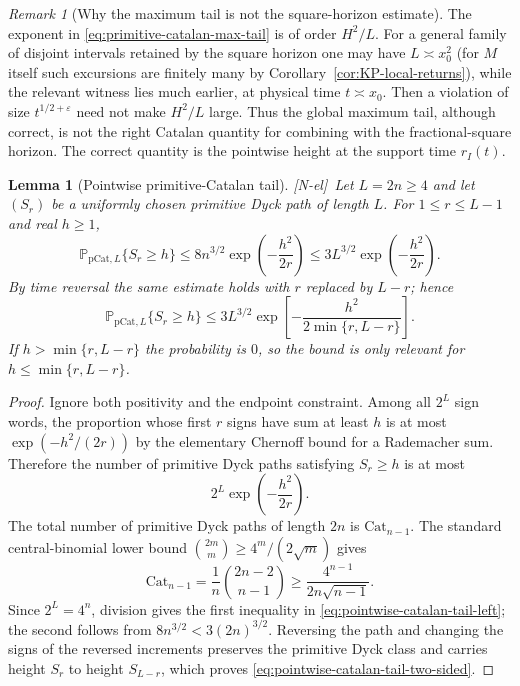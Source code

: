 \documentclass[11pt,reqno]{amsart}
\numberwithin{equation}{section}
\theoremstyle{plain}
\newtheorem{lemma}[theorem]{Lemma}
\theoremstyle{definition}
\theoremstyle{remark}
\newtheorem{remark}[theorem]{Remark}
\newcommand{\eps}{\varepsilon}
\newcommand{\tagNE}{\textup{[N-el]}}
\begin{document}
\begin{remark}[Why the maximum tail is not the square-horizon estimate]
\label{rem:max-tail-square-limit}
The exponent in \eqref{eq:primitive-catalan-max-tail} is of order
$H^2/L$.  For a general family of disjoint intervals retained by the
square horizon one may have $L\asymp x_0^2$ (for $M$ itself such excursions
are finitely many by Corollary~\ref{cor:KP-local-returns}), while the relevant witness lies much earlier, at physical
time $t\asymp x_0$.  Then a violation of size $t^{1/2+\eps}$ need not make
$H^2/L$ large.  Thus the global maximum tail, although correct, is not the
right Catalan quantity for combining with the fractional-square horizon.
The correct quantity is the pointwise height at the support time
$r_I(t)$.
\end{remark}

\begin{lemma}[Pointwise primitive-Catalan tail]
\label{lem:pointwise-catalan-tail}
\tagNE\ Let $L=2n\ge4$ and let $(S_r)$ be a uniformly chosen primitive Dyck path of
length $L$.  For $1\le r\le L-1$ and real $h\ge1$,
\begin{equation}
\label{eq:pointwise-catalan-tail-left}
 \mathbb P_{\mathrm{pCat},L}\{S_r\ge h\}
 \le 8n^{3/2}\exp\!\left(-\frac{h^2}{2r}\right)
 \le 3L^{3/2}\exp\!\left(-\frac{h^2}{2r}\right).
\end{equation}
By time reversal the same estimate holds with $r$ replaced by $L-r$;
hence
\begin{equation}
\label{eq:pointwise-catalan-tail-two-sided}
 \mathbb P_{\mathrm{pCat},L}\{S_r\ge h\}
 \le 3L^{3/2}
 \exp\!\left[-\frac{h^2}{2\min\{r,L-r\}}\right].
\end{equation}
If $h>\min\{r,L-r\}$ the probability is $0$, so the bound is only
relevant for $h\le\min\{r,L-r\}$.
\end{lemma}

\begin{proof}
Ignore both positivity and the endpoint constraint.  Among all $2^L$ sign
words, the proportion whose first $r$ signs have sum at least $h$ is at most
$\exp(-h^2/(2r))$ by the elementary Chernoff bound for a Rademacher sum.
Therefore the number of primitive Dyck paths satisfying $S_r\ge h$ is at
most
\begin{equation}
 2^L\exp\!\left(-\frac{h^2}{2r}\right).
\end{equation}
The total number of primitive Dyck paths of length $2n$ is $\mathrm{Cat}_{n-1}$.  The
standard central-binomial lower bound
$\binom{2m}{m}\ge4^m/(2\sqrt m)$ gives
\begin{equation}
 \mathrm{Cat}_{n-1}=\frac1n\binom{2n-2}{n-1}
 \ge\frac{4^{n-1}}{2n\sqrt{n-1}}.
\end{equation}
Since $2^L=4^n$, division gives the first inequality in
\eqref{eq:pointwise-catalan-tail-left}; the second follows from
$8n^{3/2}<3(2n)^{3/2}$.  Reversing the path and changing the signs of the
reversed increments preserves the primitive Dyck class and carries height
$S_r$ to height $S_{L-r}$, which proves
\eqref{eq:pointwise-catalan-tail-two-sided}.
\end{proof}
\end{document}
